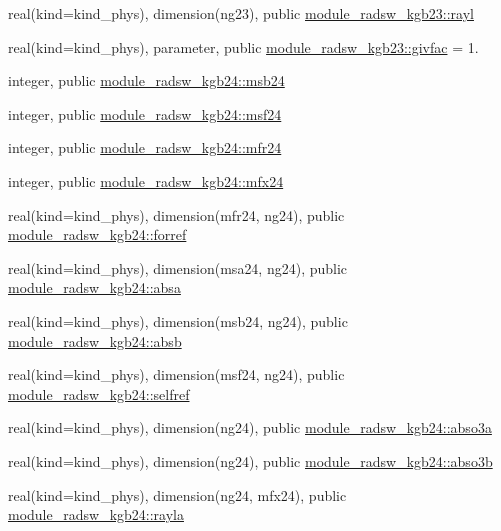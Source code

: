 \begin{DoxyCompactItemize}
\item 
real(kind=kind\+\_\+phys), dimension(ng23), public \hyperlink{group__module__radsw__main_ga40006f284543c7347eced417b9de2fc6}{module\+\_\+radsw\+\_\+kgb23\+::rayl}
\item 
real(kind=kind\+\_\+phys), parameter, public \hyperlink{group__module__radsw__main_ga5f6ced06169db4b7470e20d5639ac54c}{module\+\_\+radsw\+\_\+kgb23\+::givfac} = 1.
\item 
integer, public \hyperlink{group__module__radsw__main_ga0ec09b4df9fbfa868844ad93a84cbe31}{module\+\_\+radsw\+\_\+kgb24\+::msb24}
\item 
integer, public \hyperlink{group__module__radsw__main_ga52d0fde0af1d5427acf0d1924f393cdc}{module\+\_\+radsw\+\_\+kgb24\+::msf24}
\item 
integer, public \hyperlink{group__module__radsw__main_ga3a1c3808493ce89f2218116a02350e51}{module\+\_\+radsw\+\_\+kgb24\+::mfr24}
\item 
integer, public \hyperlink{group__module__radsw__main_ga6fcafb0e1605ad49a252ed1e22b00a5b}{module\+\_\+radsw\+\_\+kgb24\+::mfx24}
\item 
real(kind=kind\+\_\+phys), dimension(mfr24, ng24), public \hyperlink{group__module__radsw__main_gac57357ab300edcbad8f7b3801b796af3}{module\+\_\+radsw\+\_\+kgb24\+::forref}
\item 
real(kind=kind\+\_\+phys), dimension(msa24, ng24), public \hyperlink{group__module__radsw__main_ga06965ec156c4e1d18d50a70ba43bd8e1}{module\+\_\+radsw\+\_\+kgb24\+::absa}
\item 
real(kind=kind\+\_\+phys), dimension(msb24, ng24), public \hyperlink{group__module__radsw__main_gabd4db3c9678fee17f2cfd4a3e290619a}{module\+\_\+radsw\+\_\+kgb24\+::absb}
\item 
real(kind=kind\+\_\+phys), dimension(msf24, ng24), public \hyperlink{group__module__radsw__main_ga784e78b5964fadd3e3e1f57f7af30802}{module\+\_\+radsw\+\_\+kgb24\+::selfref}
\item 
real(kind=kind\+\_\+phys), dimension(ng24), public \hyperlink{group__module__radsw__main_ga3df78e9baa46df182aad6ff9b1662dc4}{module\+\_\+radsw\+\_\+kgb24\+::abso3a}
\item 
real(kind=kind\+\_\+phys), dimension(ng24), public \hyperlink{group__module__radsw__main_ga6b44aa0637523aa1f78de5b4d16c693b}{module\+\_\+radsw\+\_\+kgb24\+::abso3b}
\item 
real(kind=kind\+\_\+phys), dimension(ng24, mfx24), public \hyperlink{group__module__radsw__main_gab24774576414b5d210c34916c3d19404}{module\+\_\+radsw\+\_\+kgb24\+::rayla}

\end{DoxyCompactItemize}
